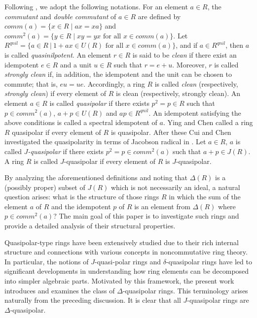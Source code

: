 \documentclass[12pt, reqno]{amsart}
\numberwithin{equation}{section}
\begin{document}
    Following \cite{Koliha}, we adopt the following notations. For an element $a\in R$, the \textit{commutant} and \textit{double commutant} of $a\in R$ are defined by $comm(a)=\{x \in R \mid ax=xa \}$ and $comm^2(a)=\{y \in R \mid xy=yx \text{ for all } x\in comm(a) \}$. Let $R^{qnil}=\{a\in R ~|~1+ax\in U(R) \text{ for all } x\in comm(a)\}$, and if $a\in R^{qnil}$, then $a$ is called \textit{quasinilpotent}. An element \( r \in R \) is said to be \emph{clean} if there exist an idempotent \( e \in R \) and a unit \( u \in R \) such that \( r = e + u \). Moreover, \( r \) is called \emph{strongly clean} if, in addition, the idempotent and the unit can be chosen to commute; that is, \( eu = ue \). Accordingly, a ring \( R \) is called \emph{clean} (respectively, \emph{strongly clean}) if every element of \( R \) is clean (respectively, strongly clean). An element $a\in R$ is called {\it quasipolar} if there exists $p^2=p\in R$ such that $p\in comm^2(a)$, $a+p\in U(R)$ and $ap\in R^{qnil}$. An idempotent satisfying the above conditions is called a spectral idempotent of $a$. Ying and Chen \cite{Ying} called a ring $R$ quasipolar if every element of $R$ is quasipolar. After these Cui and Chen investigated the quasipolarity in terms of Jacobson radical in \cite{Cui}. Let $a\in R$, $a$ is called \textit{$J$-quasipolar} if there exists $p^2=p\in comm^2(a)$ such that $a+p\in J(R)$. A ring $R$ is called $J$-quasipolar if every element of $R$ is $J$-quasipolar. 


By analyzing the aforementioned definitions and noting that $\Delta(R)$ is a (possibly proper) subset of $J(R)$ which is not necessarily an ideal, a natural question arises: what is the structure of those rings $R$ in which the sum of the element $a$ of $R$ and the idempotent $p$ of $R$ is an element from $\Delta(R)$ where $p\in comm^2(a)$? The main goal of this paper is to investigate such rings and provide a detailed analysis of their structural properties.

Quasipolar-type rings have been extensively studied due to their rich internal structure and connections with various concepts in noncommutative ring theory. In particular, the notions of $J$-quasi-\linebreak polar rings and $\delta$-quasipolar rings have led to significant developments in understanding how ring elements can be decomposed into simpler algebraic parts. Motivated by this framework, the present work introduces and examines the class of $\Delta$-quasipolar rings. This terminology arises naturally from the preceding discussion. It is clear that all $J$-quasipolar rings are $\Delta$-quasipolar.
\end{document}
